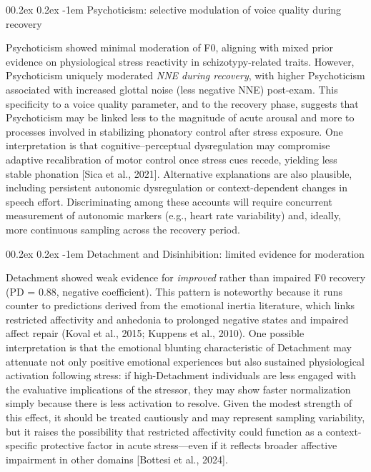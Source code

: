 \documentclass[
  english,
  man]{apa6}
\makeatletter
\let\oldparagraph\paragraph
\renewcommand{\paragraph}{
    \@ifstar
      \xxxParagraphStar
      \xxxParagraphNoStar
  }
\newcommand{\xxxParagraphStar}[1]{\oldparagraph*{#1}\mbox{}}
\newcommand{\xxxParagraphNoStar}[1]{\oldparagraph{#1}\mbox{}}
\renewcommand{\paragraph}{\@startsection{paragraph}{4}{\parindent}%
  {0\baselineskip \@plus 0.2ex \@minus 0.2ex}%
  {-1em}%
  {\normalfont\normalsize\bfseries\itshape\typesectitle}}
\makeatother
\begin{document}
\paragraph{Psychoticism: selective modulation of voice quality during recovery}\label{psychoticism-selective-modulation-of-voice-quality-during-recovery}

Psychoticism showed minimal moderation of F0, aligning with mixed prior evidence on physiological stress reactivity in schizotypy-related traits. However, Psychoticism uniquely moderated \emph{NNE during recovery}, with higher Psychoticism associated with increased glottal noise (less negative NNE) post-exam. This specificity to a voice quality parameter, and to the recovery phase, suggests that Psychoticism may be linked less to the magnitude of acute arousal and more to processes involved in stabilizing phonatory control after stress exposure. One interpretation is that cognitive--perceptual dysregulation may compromise adaptive recalibration of motor control once stress cues recede, yielding less stable phonation {[}Sica et al., 2021{]}. Alternative explanations are also plausible, including persistent autonomic dysregulation or context-dependent changes in speech effort. Discriminating among these accounts will require concurrent measurement of autonomic markers (e.g., heart rate variability) and, ideally, more continuous sampling across the recovery period.

\paragraph{Detachment and Disinhibition: limited evidence for moderation}\label{detachment-and-disinhibition-limited-evidence-for-moderation}

Detachment showed weak evidence for \emph{improved} rather than impaired F0 recovery (PD = 0.88, negative coefficient). This pattern is noteworthy because it runs counter to predictions derived from the emotional inertia literature, which links restricted affectivity and anhedonia to prolonged negative states and impaired affect repair (Koval et al., 2015; Kuppens et al., 2010). One possible interpretation is that the emotional blunting characteristic of Detachment may attenuate not only positive emotional experiences but also sustained physiological activation following stress: if high-Detachment individuals are less engaged with the evaluative implications of the stressor, they may show faster normalization simply because there is less activation to resolve. Given the modest strength of this effect, it should be treated cautiously and may represent sampling variability, but it raises the possibility that restricted affectivity could function as a context-specific protective factor in acute stress---even if it reflects broader affective impairment in other domains {[}Bottesi et al., 2024{]}.
\end{document}

